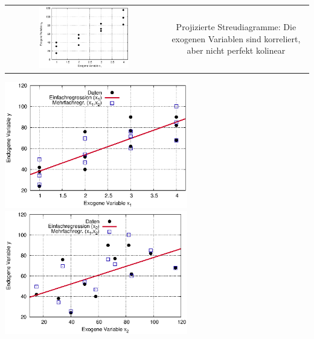 \documentclass[a4paper]{foils}
\begin{document}
\begin{landscape}
\begin{center}


\vspace{0em}

\begin{tabular}{cc}
\includegraphics[width=0.6\textwidth]{figsRegr/hotel_scatterplot_x1x2.eps}
&
\parbox{0.4\textwidth}{\vspace{-10em}

Projizierte Streudiagramme: Die 
exogenen Variablen sind korreliert, aber nicht perfekt kolinear}
\end{tabular}

\vspace{0em}

\includegraphics[width=0.6\textwidth]{figsRegr/hotel_scatterplot_x1y.eps}
\includegraphics[width=0.6\textwidth]{figsRegr/hotel_scatterplot_x2y.eps}


\end{center}
\end{landscape}
\end{document}
